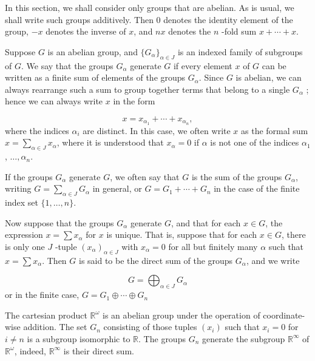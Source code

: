 

 In this section, we shall consider only groups that are abelian. As is usual, we shall write such groups additively. Then 0 denotes the identity element of the group, \(- x\) denotes the inverse of \(x\), and \({nx}\) denotes the \(n\) -fold sum \(x + \cdots + x\).

Suppose \(G\) is an abelian group, and \({\{ G_{\alpha }\} }_{\alpha \in J}\) is an indexed family of subgroups of \(G\). We say that the groups \(G_{\alpha }\) generate \(G\) if every element \(x\) of \(G\) can be written as a finite sum of elements of the groups \(G_{\alpha }\). Since \(G\) is abelian, we can always rearrange such a sum to group together terms that belong to a single \(G_{\alpha }\) ; hence we can always write \(x\) in the form

\[
x = x_{{\alpha }_{1}} + \cdots + x_{{\alpha }_{n}},
\]
where the indices \({\alpha }_{i}\) are distinct. In this case, we often write \(x\) as the formal sum \(x = \mathop{\sum }\limits_{{\alpha \in J}}x_{\alpha }\), where it is understood that \(x_{\alpha } = 0\) if \(\alpha\) is not one of the indices \({\alpha }_{1}\), \(\ldots ,{\alpha }_{n}\).

If the groups \(G_{\alpha }\) generate \(G\), we often say that \(G\) is the sum of the groups \(G_{\alpha }\), writing \(G = \mathop{\sum }\limits_{{\alpha \in J}}G_{\alpha }\) in general, or \(G = G_{1} + \cdots + G_{n}\) in the case of the finite index set \(\{ 1,\ldots, n\}\).

Now suppose that the groups \(G_{\alpha }\) generate \(G\), and that for each \(x \in G\), the expression \(x = \sum {x}_{\alpha }\) for \(x\) is unique. That is, suppose that for each \(x \in G\), there is only one \(J\) -tuple \({( x_{\alpha }) }_{\alpha \in J}\) with \(x_{\alpha } = 0\) for all but finitely many \(\alpha\) such that \(x = \sum {x}_{\alpha }\). Then \(G\) is said to be the direct sum of the groups \(G_{\alpha }\), and we write

\[
G = {\bigoplus }_{\alpha \in J}G_{\alpha }
\]
or in the finite case, \(G = G_{1} \oplus \cdots \oplus {G}_{n}\)

\begin{centeredblock}
\begin{example}
\label{ex:\thesection.\theexample}
The cartesian product \(\mathbb{R}^{\omega }\) is an abelian group under the operation of coordinate-wise addition. The set \(G_{n}\) consisting of those tuples \(( x_{i})\) such that \(x_{i} = 0\) for \(i \neq n\) is a subgroup isomorphic to \(\mathbb{R}\). The groups \(G_{n}\) generate the subgroup \(\mathbb{R}^{\infty }\) of \(\mathbb{R}^{\omega }\), indeed, \(\mathbb{R}^{\infty }\) is their direct sum.
\end{example}
\end{centeredblock}


